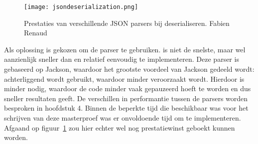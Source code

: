 \begin{figure}[h]
	\centering
	\texttt{[image: jsondeserialization.png]}
	\caption[Prestaties van JSON parsers]{Prestaties van verschillende JSON parsers bij deserialiseren.  Fabien Renaud}
	\label{fig:jsonparsersdeserialize}
\end{figure}

Als oplossing is gekozen om de  parser te gebruiken.  is niet de snelste, maar wel aanzienlijk sneller dan  en relatief eenvoudig te implementeren. Deze parser is gebaseerd op Jackson, waardoor het grootste voordeel van Jackson gedeeld wordt: achterliggend wordt  gebruikt, waardoor minder  veroorzaakt wordt. Hierdoor is minder  nodig, waardoor de code minder vaak gepauzeerd hoeft te worden en dus sneller resultaten geeft. De verschillen in performantie tussen de parsers worden besproken in hoofdstuk 4. Binnen de beperkte tijd die beschikbaar was voor het schrijven van deze masterproef was er onvoldoende tijd om  te implementeren. Afgaand op figuur~\ref{fig:jsonparsersdeserialize} zou hier echter wel nog prestatiewinst geboekt kunnen worden.